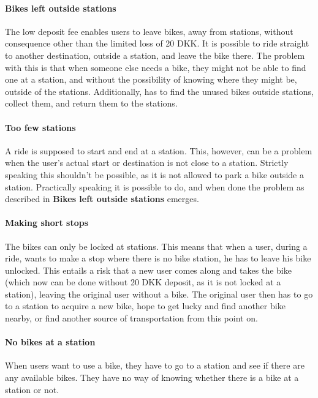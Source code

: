\paragraph{Bikes left outside stations}
The low deposit fee enables users to leave bikes, away from stations, without consequence other than the limited loss of 20 DKK.
It is possible to ride straight to another destination, outside a station, and leave the bike there.
The problem with this is that when someone else needs a bike, they might not be able to find one at a station, and without the possibility of knowing where they might be, outside of the stations.
Additionally, \citybike has to find the unused bikes outside stations, collect them, and return them to the stations.

\paragraph{Too few stations}
A ride is supposed to start and end at a station.
This, however, can be a problem when the user's actual start or destination is not close to a station.
Strictly speaking this shouldn't be possible, as it is not allowed to park a bike outside a station.
Practically speaking it is possible to do, and when done the problem as described in \textbf{Bikes left outside stations} emerges.

\paragraph{Making short stops}
The bikes can only be locked at stations.
This means that when a user, during a ride, wants to make a stop where there is no bike station, he has to leave his bike unlocked.
This entails a risk that a new user comes along and takes the bike (which now can be done without 20 DKK deposit, as it is not locked at a station), leaving the original user without a bike.
The original user then has to go to a station to acquire a new bike, hope to get lucky and find another bike nearby, or find another source of transportation from this point on.

\paragraph{No bikes at a station}
When users want to use a bike, they have to go to a station and see if there are any available bikes.
They have no way of knowing whether there is a bike at a station or not.

